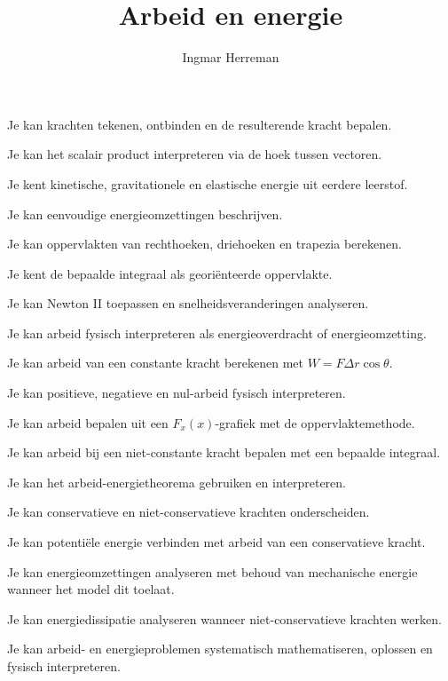 \documentclass{ximera}
\title{Arbeid en energie}
\author{Ingmar Herreman}
\begin{document}





\maketitle

\begin{voorkennis}
  \item Je kan krachten tekenen, ontbinden en de resulterende kracht bepalen.
  \item Je kan het scalair product interpreteren via de hoek tussen vectoren.
  \item Je kent kinetische, gravitationele en elastische energie uit eerdere leerstof.
  \item Je kan eenvoudige energieomzettingen beschrijven.
  \item Je kan oppervlakten van rechthoeken, driehoeken en trapezia berekenen.
  \item Je kent de bepaalde integraal als georiënteerde oppervlakte.
  \item Je kan Newton II toepassen en snelheidsveranderingen analyseren.
\end{voorkennis}

\begin{leerdoelen}
  \item Je kan arbeid fysisch interpreteren als energieoverdracht of energieomzetting.
  \item Je kan arbeid van een constante kracht berekenen met
        $W=F\Delta r\cos\theta$.
  \item Je kan positieve, negatieve en nul-arbeid fysisch interpreteren.
  \item Je kan arbeid bepalen uit een $F_x(x)$-grafiek met de oppervlaktemethode.
  \item Je kan arbeid bij een niet-constante kracht bepalen met een bepaalde integraal.
  \item Je kan het arbeid-energietheorema gebruiken en interpreteren.
  \item Je kan conservatieve en niet-conservatieve krachten onderscheiden.
  \item Je kan potentiële energie verbinden met arbeid van een conservatieve kracht.
  \item Je kan energieomzettingen analyseren met behoud van mechanische energie
        wanneer het model dit toelaat.
  \item Je kan energiedissipatie analyseren wanneer niet-conservatieve krachten werken.
  \item Je kan arbeid- en energieproblemen systematisch mathematiseren,
        oplossen en fysisch interpreteren.
\end{leerdoelen}
\end{document}
